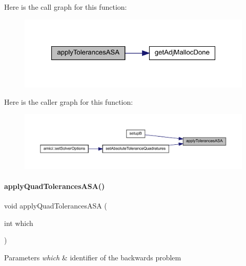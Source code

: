 Here is the call graph for this function\+:
\nopagebreak
\begin{figure}[H]
\begin{center}
\leavevmode
\includegraphics[width=321pt]{classamici_1_1_solver_abdf8989d57153fde8988e73a98979297_cgraph}
\end{center}
\end{figure}
Here is the caller graph for this function\+:
\nopagebreak
\begin{figure}[H]
\begin{center}
\leavevmode
\includegraphics[width=350pt]{classamici_1_1_solver_abdf8989d57153fde8988e73a98979297_icgraph}
\end{center}
\end{figure}
\mbox{\label{classamici_1_1_solver_a09d47957ba70f725efb5e3a385a274a6}} 
\paragraph{\texorpdfstring{applyQuadTolerancesASA()}{applyQuadTolerancesASA()}}
{\footnotesize\ttfamily void apply\+Quad\+Tolerances\+A\+SA (\begin{DoxyParamCaption}\item[{int}]{which }\end{DoxyParamCaption})\hspace{0.3cm}{\ttfamily [protected]}}


\begin{DoxyParams}{Parameters}
{\em which} & identifier of the backwards problem \\
\hline
\end{DoxyParams}


